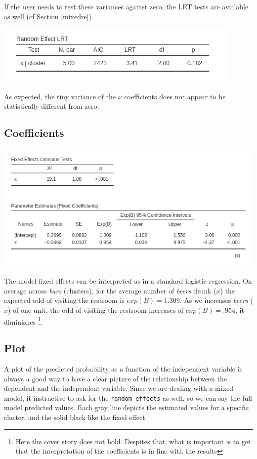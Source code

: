\documentclass[
]{book}
\begin{document}
If the user needs to test these variances against zero, the LRT tests are available as well (cf Section \ref{mixedre}).

\includegraphics[width=0.7\linewidth]{bookletpics/5_logistic_output5}

As expected, the tiny variance of the \(x\) coefficients does not appear to be statistically different from zero.

\hypertarget{coefficients-4}{%
\subsection{Coefficients}\label{coefficients-4}}

\includegraphics[width=0.8\linewidth]{bookletpics/5_logistic_output4}

The model fixed effects can be interpreted as in a standard logistic regression. On average across \emph{bars} (clusters), for the average number of \emph{beers} drunk (\(x\)) the expected odd of visiting the restroom is \(exp(B)=1.309\). As we increases \emph{beers} (\(x\)) of one unit, the odd of visiting the restroom increases of \(exp(B)=.954\), it diminishes \footnote{Here the cover story does not hold. Despites that, what is important is to get that the interpretation of the coefficients is in line with the results}.

\hypertarget{plot-2}{%
\subsection{Plot}\label{plot-2}}

A plot of the predicted probability as a function of the independent variable is always a good way to have a clear picture of the relationship between the dependent and the independent variable. Since we are dealing with a mixed model, it instructive to ask for the \texttt{random\ effects} as well, so we can say the full model predicted values. Each gray line depicts the estimated values for a specific cluster, and the solid black like the fixed effect.
\end{document}
